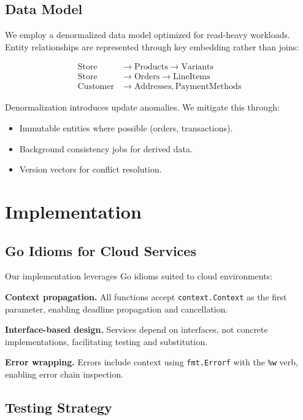 \documentclass[11pt,twocolumn]{article}
\begin{document}
\subsection{Data Model}

We employ a denormalized data model optimized for read-heavy workloads. Entity relationships are represented through key embedding rather than joins:

\begin{align}
\text{Store} &\rightarrow \text{Products} \rightarrow \text{Variants} \\
\text{Store} &\rightarrow \text{Orders} \rightarrow \text{LineItems} \\
\text{Customer} &\rightarrow \text{Addresses}, \text{PaymentMethods}
\end{align}

Denormalization introduces update anomalies. We mitigate this through:
\begin{itemize}
\item Immutable entities where possible (orders, transactions).
\item Background consistency jobs for derived data.
\item Version vectors for conflict resolution.
\end{itemize}

\section{Implementation}

\subsection{Go Idioms for Cloud Services}

Our implementation leverages Go idioms suited to cloud environments:

\textbf{Context propagation.} All functions accept \texttt{context.Context} as the first parameter, enabling deadline propagation and cancellation.

\textbf{Interface-based design.} Services depend on interfaces, not concrete implementations, facilitating testing and substitution.

\textbf{Error wrapping.} Errors include context using \texttt{fmt.Errorf} with the \texttt{\%w} verb, enabling error chain inspection.

\subsection{Testing Strategy}
\end{document}
